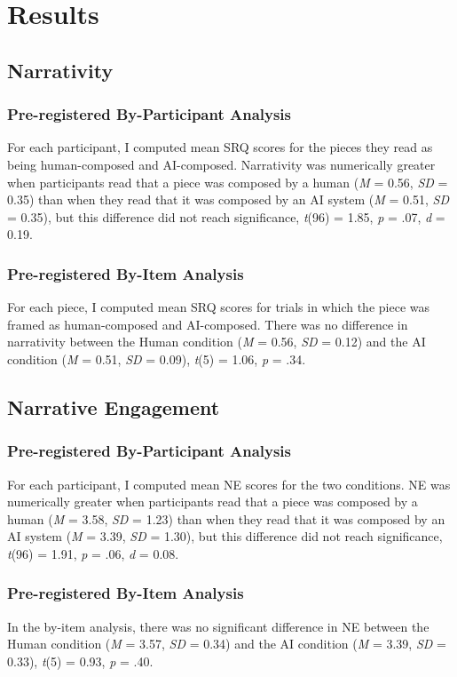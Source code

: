 \documentclass[12pt,twoside]{reedthesis}
\begin{document}
\section*{Results}
\subsection*{Narrativity}
\subsubsection*{Pre-registered By-Participant Analysis}
For each participant, I computed mean SRQ scores for the pieces they read as being human-composed and AI-composed. Narrativity was numerically greater when participants read that a piece was composed by a human (\emph{M} = 0.56, \emph{SD} = 0.35) than when they read that it was composed by an AI system (\emph{M} = 0.51, \emph{SD} = 0.35), but this difference did not reach significance, \emph{t}(96) = 1.85, \emph{p} = .07, \emph{d} = 0.19.

\subsubsection*{Pre-registered By-Item Analysis}

For each piece, I computed mean SRQ scores for trials in which the piece was framed as human-composed and AI-composed. There was no difference in narrativity between the Human condition (\emph{M} = 0.56, \emph{SD} = 0.12) and the AI condition (\emph{M} = 0.51, \emph{SD} = 0.09), \emph{t}(5) = 1.06, \emph{p} = .34.

\subsection*{Narrative Engagement}
\subsubsection*{Pre-registered By-Participant Analysis}
For each participant, I computed mean NE scores for the two conditions. NE was numerically greater when participants read that a piece was composed by a human (\emph{M} = 3.58, \emph{SD} = 1.23) than when they read that it was composed by an AI system (\emph{M} = 3.39, \emph{SD} = 1.30), but this difference did not reach significance, \emph{t}(96) = 1.91, \emph{p} = .06, \emph{d} = 0.08.
\subsubsection*{Pre-registered By-Item Analysis}
In the by-item analysis, there was no significant difference in NE between the Human condition (\emph{M} = 3.57, \emph{SD} = 0.34) and the AI condition (\emph{M} = 3.39, \emph{SD} = 0.33), \emph{t}(5) = 0.93, \emph{p} = .40. 
\end{document}
